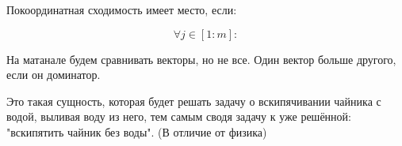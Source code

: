 \documentclass[12pt, a4paper]{article}
\begin{document}
  \begin{corollary}

  \end{corollary}

  \begin{definition}
    Покоординатная сходимость имеет место, если:

    \begin{equation}
      \forall j \in [1 : m]: 
    \end{equation}
  \end{definition}

  На матанале будем сравнивать векторы, но не все. Один вектор больше другого, если он доминатор.


\begin{definition}
  [Математик]
  Это такая сущность, которая будет решать задачу о вскипячивании чайника с водой, 
  выливая воду из него, тем самым сводя задачу к уже решённой: "вскипятить чайник без воды". (В отличие от физика)
\end{definition}
\end{document}
